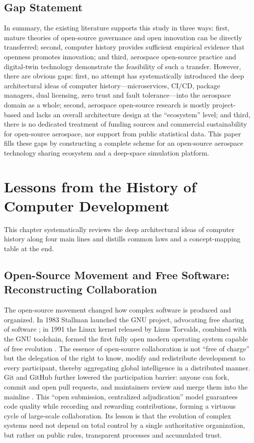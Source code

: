 \documentclass[11pt]{article}
\begin{document}
\subsection{Gap Statement}
In summary, the existing literature supports this study in three ways: first, mature theories of open-source governance and open innovation can be directly transferred; second, computer history provides sufficient empirical evidence that openness promotes innovation; and third, aerospace open-source practice and digital-twin technology demonstrate the feasibility of such a transfer. However, there are obvious gaps: first, no attempt has systematically introduced the deep architectural ideas of computer history---microservices, CI/CD, package managers, dual licensing, zero trust and fault tolerance---into the aerospace domain as a whole; second, aerospace open-source research is mostly project-based and lacks an overall architecture design at the ``ecosystem'' level; and third, there is no dedicated treatment of funding sources and commercial sustainability for open-source aerospace, nor support from public statistical data. This paper fills these gaps by constructing a complete scheme for an open-source aerospace technology sharing ecosystem and a deep-space simulation platform.

\section{Lessons from the History of Computer Development}
This chapter systematically reviews the deep architectural ideas of computer history along four main lines and distills common laws and a concept-mapping table at the end.

\subsection{Open-Source Movement and Free Software: Reconstructing Collaboration}
The open-source movement changed how complex software is produced and organized. In 1983 Stallman launched the GNU project, advocating free sharing of software \cite{stallman1985}; in 1991 the Linux kernel released by Linus Torvalds, combined with the GNU toolchain, formed the first fully open modern operating system capable of free evolution \cite{raymond1999}. The essence of open-source collaboration is not ``free of charge'' but the delegation of the right to know, modify and redistribute development to every participant, thereby aggregating global intelligence in a distributed manner. Git and GitHub further lowered the participation barrier: anyone can fork, commit and open pull requests, and maintainers review and merge them into the mainline \cite{git}. This ``open submission, centralized adjudication'' model guarantees code quality while recording and rewarding contributions, forming a virtuous cycle of large-scale collaboration. Its lesson is that the evolution of complex systems need not depend on total control by a single authoritative organization, but rather on public rules, transparent processes and accumulated trust.
\end{document}
